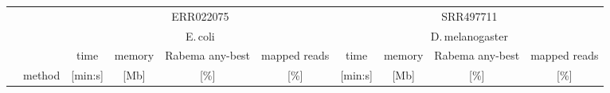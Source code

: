 \begin{tabular}{llrrccrrcc}
  \toprule

    & \multirow{2}{*}{}  &\multicolumn{ 4 }{c}{  ERR022075 } &\multicolumn{ 4 }{c}{  SRR497711 } \\
  &&\multicolumn{4}{c}{E.\,coli}&\multicolumn{4}{c}{D.\,melanogaster} \\
  \cmidrule(lr){3-6}\cmidrule(lr){7-10} 
  &  &\multicolumn{1}{c}{  time } &\multicolumn{1}{c}{  memory } &\multicolumn{1}{c}{  Rabema any-best } &\multicolumn{1}{c}{  mapped reads } &\multicolumn{1}{c}{  time } &\multicolumn{1}{c}{  memory } &\multicolumn{1}{c}{  Rabema any-best } &\multicolumn{1}{c}{  mapped reads } \\
  & method  &\multicolumn{1}{c}{  [min:s] } &\multicolumn{1}{c}{  [Mb] } &\multicolumn{1}{c}{  [\%] } &\multicolumn{1}{c}{  [\%] } &\multicolumn{1}{c}{  [min:s] } &\multicolumn{1}{c}{  [Mb] } &\multicolumn{1}{c}{  [\%] } &\multicolumn{1}{c}{  [\%] } \\
  
    \midrule
    

\end{tabular}

